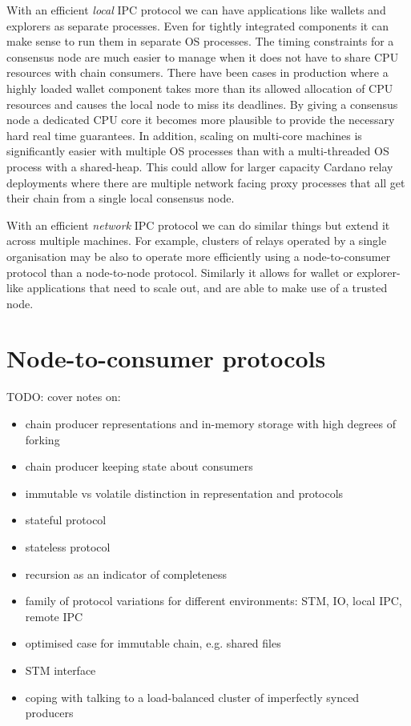 \documentclass{article}
\theoremstyle{definition}{
  \newtheorem{lemma}{Lemma}[section] %
  \newtheorem{definition}[lemma]{Definition}
}
\theoremstyle{theorem}{
  \newtheorem{invariant}[lemma]{Invariant}
  \newtheorem{proofobligation}[lemma]{Proof Obligation}
}
\numberwithin{equation}{lemma}
\begin{document}
With an efficient \emph{local} IPC protocol we can have applications like
wallets and explorers as separate processes. Even for tightly integrated
components it can make sense to run them in separate OS processes. The timing
constraints for a consensus node are much easier to manage when it does not
have to share CPU resources with chain consumers. There have been cases in
production where a highly loaded wallet component takes more than its allowed
allocation of CPU resources and causes the local node to miss its deadlines.
By giving a consensus node a dedicated CPU core it becomes more plausible to
provide the necessary hard real time guarantees. In addition, scaling on
multi-core machines is significantly easier with multiple OS processes than
with a multi-threaded OS process with a shared-heap. This could allow for
larger capacity Cardano relay deployments where there are multiple network
facing proxy processes that all get their chain from a single local consensus
node.

With an efficient \emph{network} IPC protocol we can do similar things but
extend it across multiple machines. For example, clusters of relays operated
by a single organisation may be also to operate more efficiently using a
node-to-consumer protocol than a node-to-node protocol. Similarly it allows for
wallet or explorer-like applications that need to scale out, and are able to
make use of a trusted node.

\section{Node-to-consumer protocols}

TODO: cover notes on:
\begin{itemize}
\item chain producer representations and in-memory storage with high degrees of forking
\item chain producer keeping state about consumers
\item immutable vs volatile distinction in representation and protocols
\item stateful protocol
\item stateless protocol
\item recursion as an indicator of completeness
\item family of protocol variations for different environments: STM, IO, local IPC, remote IPC
\item optimised case for immutable chain, e.g. shared files
\item STM interface
\item coping with talking to a load-balanced cluster of imperfectly synced producers
\end{itemize}
\end{document}
